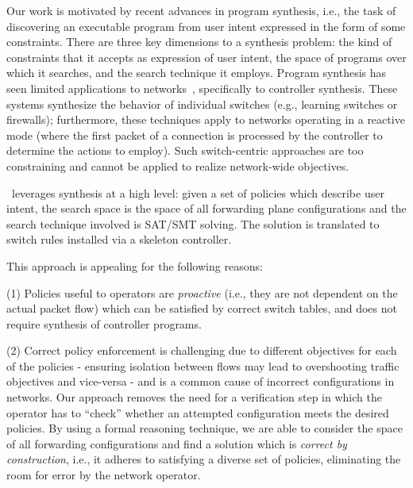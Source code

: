   Our work is motivated by recent advances in program synthesis, i.e.,
  the task of discovering an executable program from user intent
  expressed in the form of some constraints. There are three key
  dimensions to a synthesis problem: the kind of constraints that it accepts as
  expression of user intent, the space of programs over which it
  searches, and the search technique it employs. Program synthesis has
  seen limited applications to networks~\cite{netegg,decentralize},
  specifically to controller synthesis. These systems synthesize the
  behavior of individual switches (e.g., learning switches or
  firewalls); furthermore, these techniques apply to networks
  operating in a reactive mode (where the first packet of a connection
  is processed by the controller to determine the actions to
  employ). Such switch-centric approaches are too constraining and
  cannot be applied to realize network-wide objectives.

\Name\ leverages synthesis at a high level: given a set of
policies which describe user intent, the search space is the space of
all forwarding plane configurations and the search technique involved
is SAT/SMT solving. The solution is translated to switch rules installed via a skeleton controller.

This approach is appealing for the following reasons: 

(1)
Policies useful to operators are \emph{proactive} (i.e., they are not
dependent on the actual packet flow) which can be satisfied by 
correct switch tables, and does not require synthesis of controller programs.

(2) Correct policy enforcement is challenging due to different
objectives for each of the policies - ensuring isolation between flows
may lead to overshooting traffic objectives and vice-versa - and is a common
cause of incorrect configurations in networks.  Our approach removes
the need for a verification step in which the operator has to
``check'' whether an attempted configuration meets the desired
policies.  By using a formal reasoning technique, we are able to
consider the space of all forwarding configurations and find a
solution which is \emph{correct by construction}, i.e., it adheres to
satisfying a diverse set of policies, eliminating the room for error
by the network operator.

